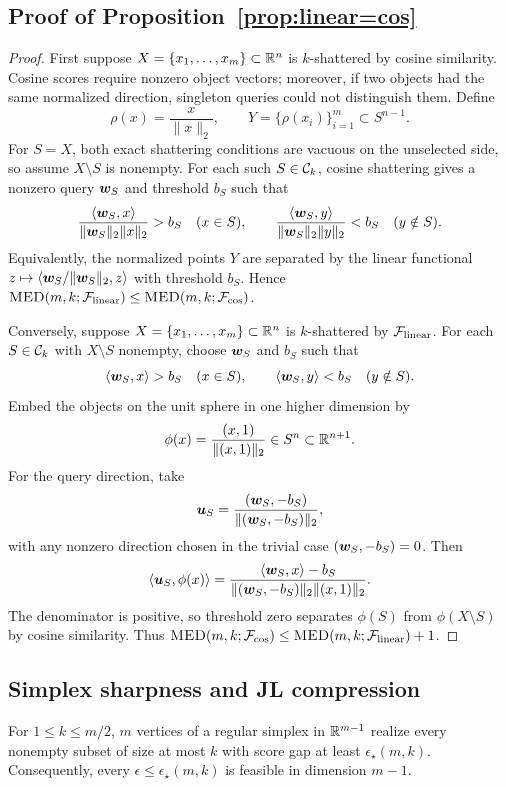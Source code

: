 \documentclass{article}
\begin{document}
\subsection{Proof of Proposition~\ref{prop:linear=cos}}\label{app:proof:prop:linear=cos}


\begin{proof}
First suppose $X=\{x_1,\dots,x_m\}\subset\mathbb{R}^n$ is $k$-shattered by cosine similarity. Cosine scores require nonzero object vectors; moreover, if two objects had the same normalized direction, singleton queries could not distinguish them. Define
\[
    \rho(x)=\frac{x}{\|x\|_2},
    \qquad
    Y=\{\rho(x_i)\}_{i=1}^m\subset S^{n-1}.
\]
For $S=X$, both exact shattering conditions are vacuous on the unselected side, so assume $X\setminus S$ is nonempty. For each such $S\in\mathcal{C}_k$, cosine shattering gives a nonzero query $\bm{w}_S$ and threshold $b_S$ such that
\[
    \frac{\langle \bm{w}_S,x\rangle}{\|\bm{w}_S\|_2\|x\|_2}
    > b_S
    \quad (x\in S),
    \qquad
    \frac{\langle \bm{w}_S,y\rangle}{\|\bm{w}_S\|_2\|y\|_2}
    < b_S
    \quad (y\notin S).
\]
Equivalently, the normalized points $Y$ are separated by the linear functional
$z\mapsto\langle \bm{w}_S/\|\bm{w}_S\|_2,z\rangle$ with threshold $b_S$. Hence
$\textsc{MED}(m,k;\mathcal{F}_{\rm linear})\leq \textsc{MED}(m,k;\mathcal{F}_{\cos})$.

Conversely, suppose $X=\{x_1,\dots,x_m\}\subset\mathbb{R}^n$ is $k$-shattered by $\mathcal{F}_{\rm linear}$. For each $S\in\mathcal{C}_k$ with $X\setminus S$ nonempty, choose $\bm{w}_S$ and $b_S$ such that
\[
    \langle \bm{w}_S,x\rangle>b_S
    \quad (x\in S),
    \qquad
    \langle \bm{w}_S,y\rangle<b_S
    \quad (y\notin S).
\]
Embed the objects on the unit sphere in one higher dimension by
\[
    \phi(x)=\frac{(x,1)}{\|(x,1)\|_2}\in S^n\subset\mathbb{R}^{n+1}.
\]
For the query direction, take
\[
    \bm{u}_S=\frac{(\bm{w}_S,-b_S)}{\|(\bm{w}_S,-b_S)\|_2},
\]
with any nonzero direction chosen in the trivial case $(\bm{w}_S,-b_S)=0$.
Then
\[
    \langle \bm{u}_S,\phi(x)\rangle
    =
    \frac{\langle \bm{w}_S,x\rangle-b_S}
    {\|(\bm{w}_S,-b_S)\|_2\|(x,1)\|_2}.
\]
The denominator is positive, so threshold zero separates $\phi(S)$ from
$\phi(X\setminus S)$ by cosine similarity. Thus
$\textsc{MED}(m,k;\mathcal{F}_{\cos})\leq \textsc{MED}(m,k;\mathcal{F}_{\rm linear})+1$.
\end{proof}

\subsection{Simplex sharpness and JL compression}\label{app:rmed-simplex-jl}

\begin{proposition}\label{prop:rmed-simplex}
For $1\leq k\leq m/2$, $m$ vertices of a regular simplex in $\mathbb{R}^{m-1}$ realize every nonempty subset of size at most $k$ with score gap at least $\epsilon_\star(m,k)$. Consequently, every $\epsilon\leq \epsilon_\star(m,k)$ is feasible in dimension $m-1$.
\end{proposition}
\end{document}
